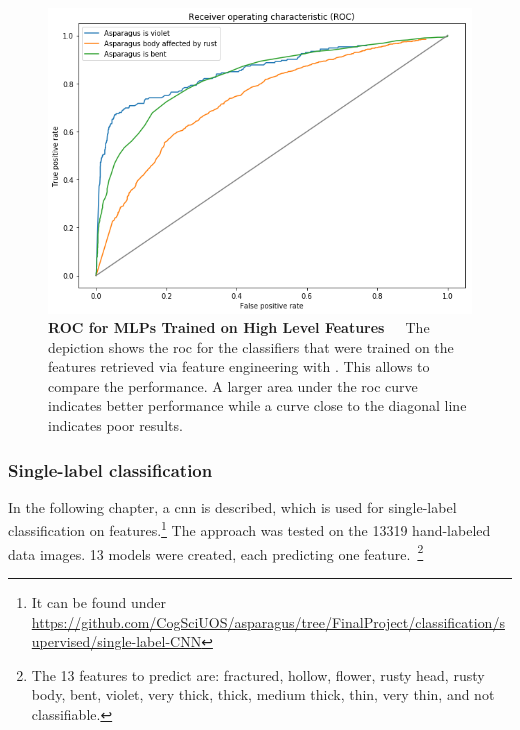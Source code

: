 \begin{figure}[!htb]
	\centering
	\includegraphics[scale=0.6]{Figures/chapter04/fe_roc.png}
	\caption[Feature Engineering ROC Curve]{\textbf{ROC for MLPs Trained on High Level Features}~~~The depiction shows the \acrfull{roc} for the classifiers that were trained on the features retrieved via feature engineering with . This allows to compare the performance. A larger area under the \acrshort{roc} curve indicates better performance while a curve close to the diagonal line indicates poor results.}
	\label{fig:FeatureEngineeringROC}
\end{figure}


\subsubsection{Single-label classification}
\label{subsec:SingleLabel}

In the following chapter, a \acrlong{cnn} is described, which is used for single-label classification on features.\footnote{It can be found under \url{https://github.com/CogSciUOS/asparagus/tree/FinalProject/classification/supervised/single-label-CNN}} The approach was tested on the 13319 hand-labeled data images. 13 models were created, each predicting one feature.~\footnote{The 13 features to predict are: fractured, hollow, flower, rusty head, rusty body, bent, violet, very thick, thick, medium thick, thin, very thin, and not classifiable.}

